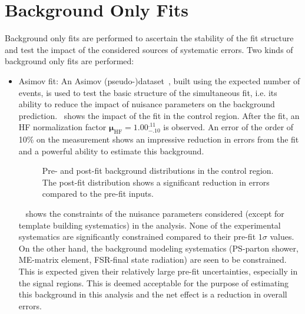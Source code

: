 \section{Background Only Fits}
Background only fits are performed to ascertain the stability of the fit structure and test the impact of the considered sources of systematic errors. Two kinds of background only fits are performed:

\begin{itemize}
    \item Asimov fit: An Asimov (pseudo-)dataset~\cite{Cowan:2010js}, built using the expected number of events, is used to test the basic structure of the simultaneous fit, i.e. its ability to reduce the impact of nuisance parameters on the background prediction.~ shows the impact of the fit in the \uuu control region. After the fit, an HF normalization factor $\mathbf{\mu_\mathrm{HF}=1.00^{.11}_{-.10}}$ is observed. An error of the order of 10\% on the measurement shows an impressive reduction in errors from the fit and a powerful ability to estimate this background. 

    \begin{figure}[!htbp]
        \centering
        \caption{Pre- and post-fit background distributions in the \uuu control region. The post-fit distribution shows a significant reduction in errors compared to the pre-fit inputs.}
        \label{fig:asimov_pre_post}
    \end{figure}

    ~ shows the constraints of the nuisance parameters considered (except for template building systematics) in the analysis. None of the experimental systematics are significantly constrained compared to their pre-fit $1\sigma$ values. On the other hand, the background modeling systematics (PS-parton shower, ME-matrix element, FSR-final state radiation) are seen to be constrained. This is expected given their relatively large pre-fit uncertainties, especially in the signal regions. This is deemed acceptable for the purpose of estimating this background in this analysis and the net effect is a reduction in overall errors.


\end{itemize}
